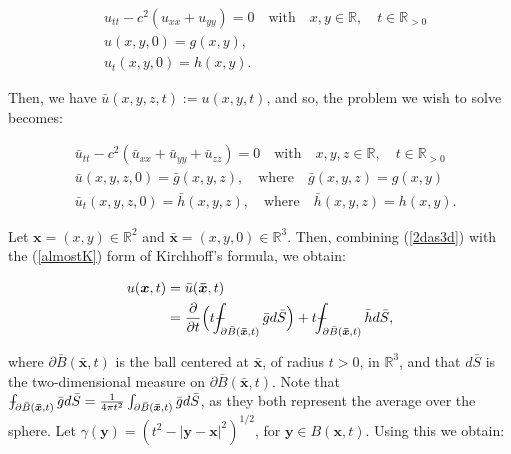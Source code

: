 \documentclass[a4paper, 12pt]{article}
\def\Xint#1{\mathchoice
{\XXint\displaystyle\textstyle{#1}}%
{\XXint\textstyle\scriptstyle{#1}}%
{\XXint\scriptstyle\scriptscriptstyle{#1}}%
{\XXint\scriptscriptstyle\scriptscriptstyle{#1}}%
\!\int}
\def\XXint#1#2#3{{\setbox0=\hbox{$#1{#2#3}{\int}$ }
\vcenter{\hbox{$#2#3$ }}\kern-.6\wd0}}
\def\dashint{\Xint-}
\numberwithin{equation}{section}
\begin{document}
\begin{equation} \label{2d}
    \begin{aligned}
        &u_{tt}-c^2(u_{xx}+u_{yy})=0 \quad \textrm{with} \quad x,y \in \mathbb{R}, \quad t\in \mathbb{R}_{>0}\\
        &u(x, y, 0)=g(x,y),\\
        &u_t(x,y,0)=h(x,y).
    \end{aligned}
\end{equation}

Then, we have $\bar{u}(x, y, z, t):=u(x, y, t)$, and so, the problem we wish to solve becomes:

\begin{equation} \label{2das3d}
    \begin{aligned}
        &\bar{u}_{tt}-c^2(\bar{u}_{xx}+\bar{u}_{yy}+\bar{u}_{zz})=0 \quad \textrm{with} \quad x,y,z \in \mathbb{R}, \quad t\in \mathbb{R}_{>0}\\
        &\bar{u}(x, y, z, 0)=\bar{g}(x,y,z), \quad \textrm{where} \quad \bar{g}(x,y,z)=g(x,y)\\
        &\bar{u}_t(x,y,z,0)=\bar{h}(x,y,z), \quad \textrm{where} \quad \bar{h}(x,y,z)=h(x,y).
    \end{aligned}
\end{equation}

Let $\boldsymbol{x}=(x,y)\in \mathbb{R}^2$ and $\boldsymbol{\bar{x}}=(x,y, 0)\in \mathbb{R}^3$. Then, combining (\ref{2das3d}) with the (\ref{almostK}) form of Kirchhoff's formula, we obtain:

\begin{equation} \label{star}
    \begin{aligned}
        u(\boldsymbol{x},t)&=\bar{u}(\boldsymbol{\bar{x}}, t)\\
        &=\diffp[1]{}{t}\Big(t\dashint_{\partial \bar{B}(\boldsymbol{\bar{x}}, t)} \bar{g} d\bar{S}\Big)+t \dashint_{\partial \bar{B}(\boldsymbol{\bar{x}}, t)} \bar{h}d\bar{S},
    \end{aligned}
\end{equation}

where $\partial\bar{B}(\boldsymbol{\bar{x}},t)$ is the ball centered at $\boldsymbol{\bar{x}}$, of radius $t>0$, in $\mathbb{R}^3$, and that $d\bar{S}$ is the two-dimensional measure on 
$\partial\bar{B}(\boldsymbol{\bar{x}},t)$. Note that $\dashint_{\partial \bar{B}(\boldsymbol{\bar{x}}, t)} \bar{g} d\bar{S}=\frac{1}{4\pi t^2}\int_{\partial \bar{B}(\boldsymbol{\bar{x}}, t)}\bar{g} d\bar{S}$, as they
both represent the average over the sphere. Let $\gamma (\boldsymbol{y})=(t^2-|\boldsymbol{y}-\boldsymbol{x}|^2)^{1/2}$, for $\boldsymbol{y} \in B(\boldsymbol{x}, t)$. Using 
this we obtain:
\end{document}
